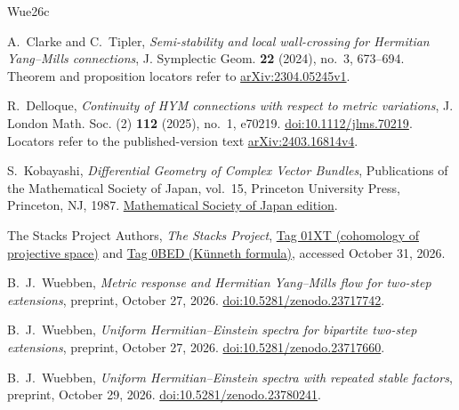\documentclass[11pt]{amsart}
\theoremstyle{definition}
\theoremstyle{remark}
\begin{document}
\FloatBarrier
\begin{thebibliography}{Wue26c}

A.~Clarke and C.~Tipler,
\emph{Semi-stability and local wall-crossing for Hermitian Yang--Mills connections},
J. Symplectic Geom. \textbf{22} (2024), no.~3, 673--694.
Theorem and proposition locators refer to
\href{https://arxiv.org/abs/2304.05245v1}{arXiv:2304.05245v1}.

R.~Delloque, \emph{Continuity of HYM connections with respect to metric variations},
J. London Math. Soc. (2) \textbf{112} (2025), no.~1, e70219.
\href{https://doi.org/10.1112/jlms.70219}{doi:10.1112/jlms.70219}.
Locators refer to the published-version text
\href{https://arxiv.org/abs/2403.16814v4}{arXiv:2403.16814v4}.

S.~Kobayashi, \emph{Differential Geometry of Complex Vector Bundles},
Publications of the Mathematical Society of Japan, vol.~15,
Princeton University Press, Princeton, NJ, 1987.
\href{https://www.mathsoc.jp/assets/pdf/publications/pubmsj/Vol15.pdf}{Mathematical Society of Japan edition}.

The Stacks Project Authors, \emph{The Stacks Project},
\href{https://stacks.math.columbia.edu/tag/01XT}{Tag 01XT (cohomology of projective space)}
and \href{https://stacks.math.columbia.edu/tag/0BED}{Tag 0BED (K\"unneth formula)},
accessed October 31, 2026.

B.~J.~Wuebben, \emph{Metric response and Hermitian Yang--Mills flow
for two-step extensions}, preprint, October 27, 2026.
\href{https://doi.org/10.5281/zenodo.23717742}{doi:10.5281/zenodo.23717742}.

B.~J.~Wuebben, \emph{Uniform Hermitian--Einstein spectra for bipartite
two-step extensions}, preprint, October 27, 2026.
\href{https://doi.org/10.5281/zenodo.23717660}{doi:10.5281/zenodo.23717660}.

B.~J.~Wuebben, \emph{Uniform Hermitian--Einstein spectra with repeated
stable factors}, preprint, October 29, 2026.
\href{https://doi.org/10.5281/zenodo.23780241}{doi:10.5281/zenodo.23780241}.

\end{thebibliography}
\end{document}
